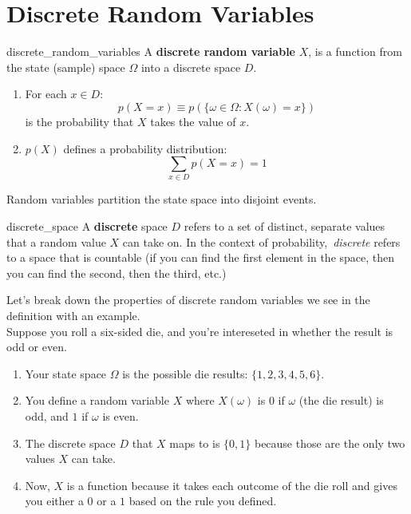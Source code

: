 \documentclass{mlnotes}
\begin{document}
\section{Discrete Random Variables}
\begin{definition}{}{discrete_random_variables}
A \textbf{discrete random variable} \(X\), is a function from the state (sample)
space \(\Omega\) into a discrete space \(D\).

\begin{enumerate}
  \item For each \(x \in D\):
    \[p(X = x) \equiv p(\{\omega \in \Omega : X(\omega) = x\})\]
  is the probability that \(X\) takes the value of \(x\).

  \item \(p(X)\) defines a probability distribution:
  \[
    \sum_{x \in D} p(X = x) = 1
  \]
\end{enumerate}

Random variables partition the state space into disjoint events.

\begin{definition}{}{discrete_space}
  A \textbf{discrete} space \(D\) refers to a set of distinct, separate values that a
  random value \(X\) can take on. In the context of probability,\
  \emph{discrete} refers to a space that is countable (if you can find the
  first element in the space, then you can find the second, then the third, etc.)
\end{definition}
\end{definition}
Let's break down the properties of discrete random variables we see in the
definition with an example.
\\[12pt]
Suppose you roll a six-sided die, and you're intereseted in whether the result
is odd or even.
\begin{enumerate}
  \item Your state space \(\Omega\) is the possible die results: \(\{1,2,3,4,5,6\}\).
  \item You define a random variable \(X\) where \(X(\omega)\) is \(0\) if
  \(\omega\) (the die result) is odd, and \(1\) if \(\omega\) is even.
  \item The discrete space \(D\) that \(X\) maps to is \(\{0,1\}\) because those
  are the only two values \(X\) can take.
  \item Now, \(X\) is a function because it takes each outcome of the die roll
  and gives you either a \(0\) or a \(1\) based on the rule you defined.
\end{enumerate}
\end{document}

